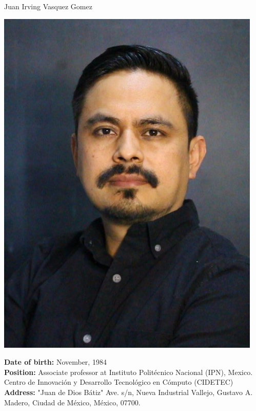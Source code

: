 \documentclass[10pt]{article}
\begin{document}
	
	\begin{center}
		{\huge Juan Irving Vasquez Gomez}
		\vspace{0.5cm}
		
		\begin{minipage}[b]{0.3\linewidth}
			\centering
			\includegraphics[width=\textwidth]{jivg36}
		\end{minipage}
		\hspace{0.5cm}
		\begin{minipage}[b]{0.6\linewidth}
			\textbf{Date of birth:} November, 1984 \\
			\textbf{Position:} Associate professor at Instituto Politécnico Nacional (IPN), Mexico.
			Centro de Innovación y Desarrollo Tecnológico en Cómputo (CIDETEC) \\ 
			\textbf{Address:} "Juan de Dios Bátiz" Ave. s/n, Nueva Industrial Vallejo, Gustavo A. Madero, Ciudad de México, México, 07700. \\

\end{minipage}
\end{center}
\end{document}

